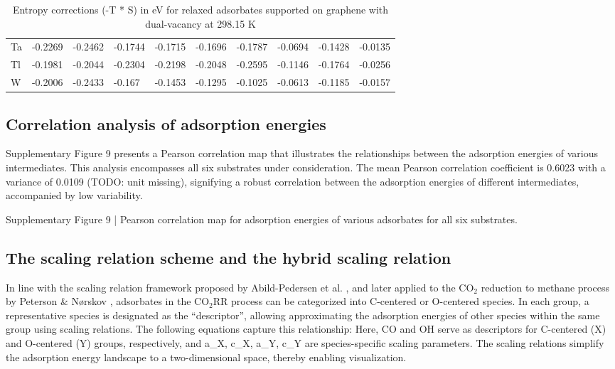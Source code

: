 \begin{table}[h]
{\begin{tabular}{*{10}{l}}
      Ta & -0.2269 & -0.2462 & -0.1744 & -0.1715 & -0.1696 & -0.1787 & -0.0694 & -0.1428 & -0.0135 \\
      Tl & -0.1981 & -0.2044 & -0.2304 & -0.2198 & -0.2048 & -0.2595 & -0.1146 & -0.1764 & -0.0256 \\
      W  & -0.2006 & -0.2433 & -0.167  & -0.1453 & -0.1295 & -0.1025 & -0.0613 & -0.1185 & -0.0157 \\
      \hline
  \end{tabular}
  }
  \caption{Entropy corrections (-T * S) in eV for relaxed adsorbates supported on graphene with dual-vacancy at 298.15 K}
  \label{si_table12}
\end{table}


\subsection{Correlation analysis of adsorption energies}
Supplementary Figure 9 presents a Pearson correlation map that illustrates the relationships between the adsorption energies of various intermediates. This analysis encompasses all six substrates under consideration. The mean Pearson correlation coefficient is 0.6023 with a variance of 0.0109 (TODO: unit missing), signifying a robust correlation between the adsorption energies of different intermediates, accompanied by low variability.


Supplementary Figure 9 | Pearson correlation map for adsorption energies of various adsorbates for all six substrates.


\subsection{The scaling relation scheme and the hybrid scaling relation}
In line with the scaling relation framework proposed by Abild-Pedersen et al. \cite{abild2007scaling}, and later applied to the CO$_2$ reduction to methane process by Peterson & Nørskov \cite{peterson2012activity}, adsorbates in the CO$_2$RR process can be categorized into C-centered or O-centered species. In each group, a representative species is designated as the “descriptor”, allowing approximating the adsorption energies of other species within the same group using scaling relations. The following equations capture this relationship:
Here, CO and OH serve as descriptors for C-centered (X) and O-centered (Y) groups, respectively, and a_X, c_X, a_Y, c_Y are species-specific scaling parameters. The scaling relations simplify the adsorption energy landscape to a two-dimensional space, thereby enabling visualization.

